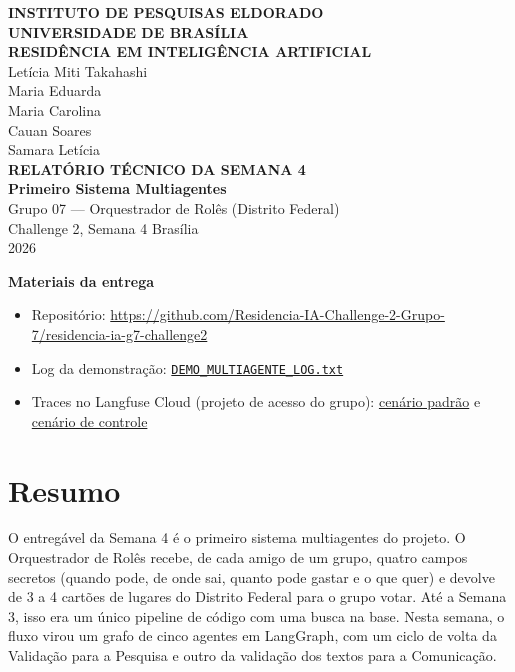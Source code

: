 \documentclass[12pt,a4paper]{article}
\begin{document}
\begin{titlepage}
\begin{center}
\onehalfspacing
\textbf{INSTITUTO DE PESQUISAS ELDORADO}\\
\textbf{UNIVERSIDADE DE BRASÍLIA}\\
\textbf{RESIDÊNCIA EM INTELIGÊNCIA ARTIFICIAL}\\[1.8cm]
Letícia Miti Takahashi\\Maria Eduarda\\Maria Carolina\\Cauan Soares\\Samara Letícia\\[1.8cm]
\vfill
\textbf{\MakeUppercase{Relatório Técnico da Semana 4}}\\[0.3cm]
\textbf{Primeiro Sistema Multiagentes}\\[0.6cm]
Grupo 07 --- Orquestrador de Rolês (Distrito Federal)\\
Challenge 2, Semana 4
\vfill
Brasília\\
2026
\end{center}
\end{titlepage}

\noindent\textbf{Materiais da entrega}
\begin{itemize}
\item Repositório: \url{https://github.com/Residencia-IA-Challenge-2-Grupo-7/residencia-ia-g7-challenge2}
\item Log da demonstração: \href{https://github.com/Residencia-IA-Challenge-2-Grupo-7/residencia-ia-g7-challenge2/blob/main/docs/entregas/semana-04/DEMO_MULTIAGENTE_LOG.txt}{\texttt{DEMO\_\allowbreak{}MULTIAGENTE\_\allowbreak{}LOG.txt}}
\item Traces no Langfuse Cloud (projeto de acesso do grupo): \href{https://cloud.langfuse.com/project/cmw59be2y01d8ad0jqbgsjut6/traces/c79c277ce1627d3a63be8c6815d9b11f}{cenário padrão} e \href{https://cloud.langfuse.com/project/cmw59be2y01d8ad0jqbgsjut6/traces/e4f11619f662d0fc9e9c99460427f129}{cenário de controle}
\end{itemize}


\section{Resumo}
O entregável da Semana 4 é o primeiro sistema multiagentes do projeto. O Orquestrador de Rolês recebe, de cada amigo de um grupo, quatro campos secretos (quando pode, de onde sai, quanto pode gastar e o que quer) e devolve de 3 a 4 cartões de lugares do Distrito Federal para o grupo votar. Até a Semana 3, isso era um único pipeline de código com uma busca na base. Nesta semana, o fluxo virou um grafo de cinco agentes em LangGraph, com um ciclo de volta da Validação para a Pesquisa e outro da validação dos textos para a Comunicação.
\end{document}

